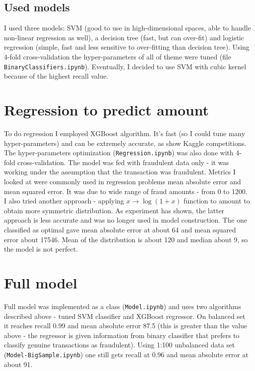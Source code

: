 \documentclass[11pt, a4paper, notitlepage]{article}
\begin{document}
\subsection{Used models}
I used three models: SVM (good to use in high-dimensional spaces, able to handle non-linear regression as well), a decision tree (fast, but can over-fit) and logistic regression (simple, fast and less sensitive to over-fitting than decision tree). Using 4-fold cross-validation the hyper-parameters of all of theme were tuned (file \verb|BinaryClassifiers.ipynb|). 
Eventually, I decided to use SVM with cubic kernel because of the highest recall value.

\section{Regression to predict amount}
To do regression I employed XGBoost algorithm. It's fast (so I could tune many hyper-parameters) and can be extremely accurate, as show Kaggle competitions. The hyper-parameters optimization (\verb|Regression.ipynb|) was also done with 4-fold cross-validation. The model was fed with fraudulent data only - it was working under the assumption that the transaction was fraudulent. Metrics I looked at were commonly used in regression problems mean absolute error and mean squared error. It was due to wide range of fraud amounts - from 0 to 1200. I also tried another approach - applying $x\to \log(1+x)$ function to amount to obtain more symmetric distribution. As experiment has shown, the latter approach is less accurate and was no longer used in model construction.
The one classified as optimal gave mean absolute error at about 64 and mean squared error about 17546. Mean of the distribution is about 120 and median about 9, so the model is not perfect.

\section{Full model}
Full model was implemented as a class (\verb|Model.ipynb|) and uses two algorithms described above - tuned SVM classifier and XGBoost regressor. On balanced set it reaches recall 0.99 and mean absolute error 87.5 (this is greater than the value above - the regressor is given information from binary classifier that prefers to classify genuine transactions as fraudulent). Using 1:100 unbalanced data set (\verb|Model-BigSample.ipynb|) one still gets recall at 0.96 and mean absolute error at about 91.
\end{document}
